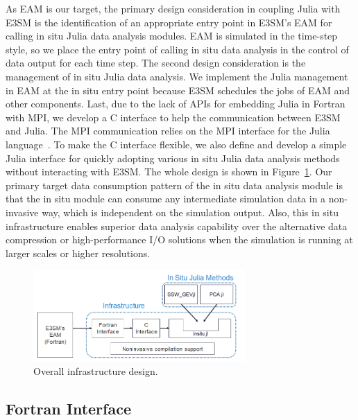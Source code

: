 \documentclass{juliacon}
\begin{document}
As EAM is our target, the primary design consideration in coupling Julia with E3SM is the identification of an appropriate entry point in E3SM's EAM for calling in situ Julia data analysis modules. EAM is simulated in the time-step style, so we place the entry point of calling in situ data analysis in the control of data output for each time step. The second design consideration is the management of in situ Julia data analysis. We implement the Julia management in EAM at the in situ entry point because E3SM schedules the jobs of EAM and other components. Last, due to the lack of APIs for embedding Julia in Fortran with MPI, we develop a C interface to help the communication between E3SM and Julia. The MPI communication relies on the MPI interface for the Julia language~\cite{byrne2021mpi}. To make the C interface flexible, we also define and develop a simple Julia interface for quickly adopting various in situ Julia data analysis methods without interacting with E3SM. The whole design is shown in Figure~\ref{fig:infra}. Our primary target data consumption pattern of the in situ data analysis module is that the in situ module can consume any intermediate simulation data in a non-invasive way, which is independent on the simulation output. Also, this in situ infrastructure enables superior data analysis capability over the alternative data compression or high-performance I/O solutions when the simulation is running at larger scales or higher resolutions.


\begin{figure}
    \centering
    \includegraphics[width=\linewidth, height=3.5cm]{figures/infra.png}
    \caption{Overall infrastructure design.}
    \label{fig:infra}
\end{figure}



\subsection{Fortran Interface}
\end{document}
